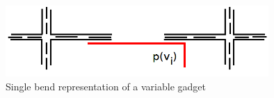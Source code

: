 \begin{figure}[htb]	
\center%
\includegraphics[width=10cm]{./img/gadgetVariavel.png}
\caption{Single bend representation of a variable gadget}
\label{fig:gadgetVariavel}
\end{figure}